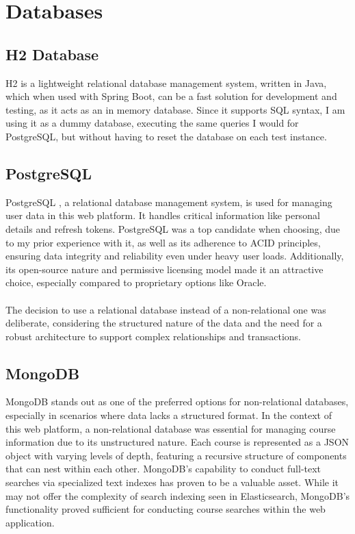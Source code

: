 \section{Databases}

\subsection{H2 Database}

\noindent H2 \cite{h2} is a lightweight relational database management system, written in Java, which when used with Spring Boot, can be a fast solution for development and testing, as it acts as an in memory database. Since it supports SQL syntax, I am using it as a dummy database, executing the same queries I would for PostgreSQL, but without having to reset the database on each test instance.

\subsection{PostgreSQL}

\noindent PostgreSQL \cite{postgresql}, a relational database management system, is used for managing user data in this web platform. It handles critical information like personal details and refresh tokens. PostgreSQL was a top candidate when choosing, due to my prior experience with it, as well as its adherence to ACID principles, ensuring data integrity and reliability even under heavy user loads. Additionally, its open-source nature and permissive licensing model made it an attractive choice, especially compared to proprietary options like Oracle.
\\\\
\noindent The decision to use a relational database instead of a non-relational one was deliberate, considering the structured nature of the data and the need for a robust architecture to support complex relationships and transactions.

\subsection{MongoDB}

\noindent MongoDB \cite{mongodb} stands out as one of the preferred options for non-relational databases, especially in scenarios where data lacks a structured format. In the context of this web platform, a non-relational database was essential for managing course information due to its unstructured nature. Each course is represented as a JSON object with varying levels of depth, featuring a recursive structure of components that can nest within each other. MongoDB's capability to conduct full-text searches via specialized text indexes has proven to be a valuable asset. While it may not offer the complexity of search indexing seen in Elasticsearch, MongoDB's functionality proved sufficient for conducting course searches within the web application.


